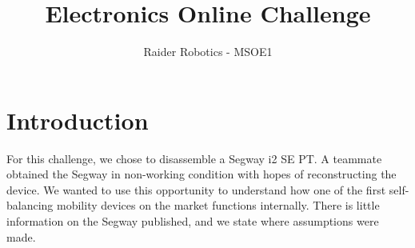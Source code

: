 \documentclass[]{formalLabReport}
\begin{document}
\title{Electronics Online Challenge}
\author{Raider Robotics - MSOE1}

\maketitle

\tableofcontents

\listoftables

\listoffigures

\newpage

\section{Introduction}
For this challenge, we chose to disassemble a Segway i2 SE PT. A teammate obtained the Segway in non-working condition with hopes of reconstructing the device. We wanted to use this opportunity to understand how one of the first self-balancing mobility devices on the market functions internally. There is little information on the Segway published, and we state where assumptions were made.
\end{document}
